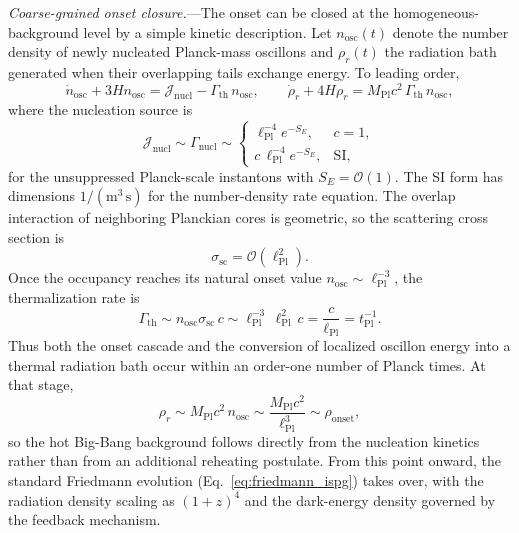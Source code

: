 \documentclass[aps,prd,onecolumn,superscriptaddress,nofootinbib,showpacs,12pt,notitlepage]{revtex4-2}
\newcommand{\Mpl}{M_{\mathrm{Pl}}}
\renewcommand{\order}[1]{\mathcal{O}\!\left(#1\right)}
\begin{document}
\textit{Coarse-grained onset closure.}---The onset can be
closed at the homogeneous-background level by a simple
kinetic description.  Let $n_{\mathrm{osc}}(t)$ denote the
number density of newly nucleated Planck-mass oscillons and
$\rho_r(t)$ the radiation bath generated when their
overlapping tails exchange energy.  To leading order,
\begin{equation}\label{eq:onset_rate_eqs}
  \dot n_{\mathrm{osc}} + 3H n_{\mathrm{osc}}
  = \mathcal{J}_{\mathrm{nucl}}
    - \Gamma_{\mathrm{th}}\,n_{\mathrm{osc}},
  \qquad
  \dot\rho_r + 4H\rho_r
  = \Mpl c^2\,\Gamma_{\mathrm{th}}\,n_{\mathrm{osc}},
\end{equation}
where the nucleation source is
\begin{equation}\label{eq:onset_nucleation_source}
  \mathcal{J}_{\mathrm{nucl}}
  \sim \Gamma_{\mathrm{nucl}}
  \sim
  \begin{cases}
    \ell_{\mathrm{Pl}}^{-4}e^{-S_E}, & c=1,\\
    c\,\ell_{\mathrm{Pl}}^{-4}e^{-S_E}, & \mathrm{SI},
  \end{cases}
\end{equation}
for the unsuppressed Planck-scale instantons with
$S_E = \order{1}$.  The SI form has dimensions
$1/(\mathrm{m}^{3}\,\mathrm{s})$ for the number-density
rate equation.  The overlap interaction of neighboring
Planckian cores is geometric, so the scattering cross section
is
\begin{equation}\label{eq:onset_cross_section}
  \sigma_{\mathrm{sc}} = \order{\ell_{\mathrm{Pl}}^{2}}.
\end{equation}
Once the occupancy reaches its natural onset value
$n_{\mathrm{osc}} \sim \ell_{\mathrm{Pl}}^{-3}$, the
thermalization rate is
\begin{equation}\label{eq:onset_gamma_th}
  \Gamma_{\mathrm{th}}
  \sim n_{\mathrm{osc}}\sigma_{\mathrm{sc}}\,c
  \sim \ell_{\mathrm{Pl}}^{-3}\,\ell_{\mathrm{Pl}}^2\,c
  = \frac{c}{\ell_{\mathrm{Pl}}}
  = t_{\mathrm{Pl}}^{-1}.
\end{equation}
Thus both the onset cascade and the conversion of localized
oscillon energy into a thermal radiation bath occur within an
order-one number of Planck times.  At that stage,
\begin{equation}\label{eq:onset_radiation_density}
  \rho_r
  \sim \Mpl c^2\,n_{\mathrm{osc}}
  \sim \frac{\Mpl c^2}{\ell_{\mathrm{Pl}}^3}
  \sim \rho_{\mathrm{onset}},
\end{equation}
so the hot Big-Bang background follows directly from the
nucleation kinetics rather than from an additional reheating
postulate.  From this point onward, the standard Friedmann
evolution (Eq.~\ref{eq:friedmann_ispg}) takes over, with the
radiation density scaling as $(1+z)^4$ and the dark-energy
density governed by the feedback mechanism.
\end{document}
